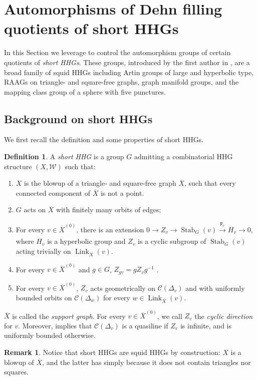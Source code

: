 \documentclass[svgnames]{amsart}
\theoremstyle{plain}
\theoremstyle{definition}
\newtheorem{defn}[thm]{Definition}
\newtheorem{rem}[thm]{Remark}
\newcommand{\C}[1]{\mathcal{C}(#1)}
\newcommand{\link}[2]{\operatorname{Link}_{#1}\left(#2\right)}
\newcommand{\W}{\mathcal{W}}
\newcommand{\p}{\mathfrak{p}}
\newcommand{\squid}[1]{squid}
\newcommand{\Stab}[2]{\operatorname{Stab}_{#1}\left(#2\right)}
\newcommand{\ov}[1]{\overline{#1}}
\begin{document}
\section{Automorphisms of Dehn filling quotients of short HHGs}
\label{sec:Aut}
In this Section we leverage  to control the automorphism groups of certain quotients of \emph{short HHGs}. These groups, introduced by the first author in \cite{short_HHG:I}, are a broad family of \squid{} HHGs including Artin groups of large and hyperbolic type, RAAGs on triangle- and square-free graphs, graph manifold groups, and the mapping class group of a sphere with five punctures.
\subsection{Background on short HHGs}\label{sec:short_are_squid} We first recall the definition and some properties of short HHGs.
    \begin{defn}\label{def:short_HHG}
        A \emph{short HHG} is a group $G$ admitting a combinatorial HHG structure $(X,\W)$ such that:
        \begin{enumerate}
            \item $X$ is the blowup of a triangle- and square-free graph $\ov X$, such that every connected component of $\ov X$ is not a point. 
            \item $G$ acts on $\ov X$ with finitely many orbits of edges;
            \item For every $v\in\ov{X}^{(0)}$, there is an extension $0\to Z_v\to \Stab{G}{v}\xrightarrow[]{\p_v}H_v\to0$, where $H_v$ is a hyperbolic group and $Z_v$ is a cyclic subgroup of $\Stab{G}{v}$ acting trivially on $\link{\ov{X}}{v}$. 
            \item \label{shortdef_normal} For every $v\in \ov{X}^{(0)}$ and $g\in G$, $Z_{gv}=gZ_vg^{-1}$ .
            \item \label{shortdef_action_on_line} For every $v\in \ov{X}^{(0)}$, $Z_v$ acts geometrically on $\C{\Delta_v}$ and with uniformly bounded orbits on $\C{\Delta_w}$ for every $w\in\link{\ov X}{v}$. 
        \end{enumerate}
    \end{defn}
    \noindent $\ov X$ is called the \emph{support graph}. For every $v\in \ov X^{(0)}$, we call $Z_v$ the \emph{cyclic direction} for $v$. Moreover,  implies that $\C{\Delta_v}$ is a quasiline if $Z_v$ is infinite, and is uniformly bounded otherwise. 
    \begin{rem}
        Notice that short HHGs are \squid{} HHGs by construction: $X$ is a blowup of $\ov X$, and the latter has \cleanish{} simply because it does not contain triangles nor squares. 
    \end{rem}
\end{document}
